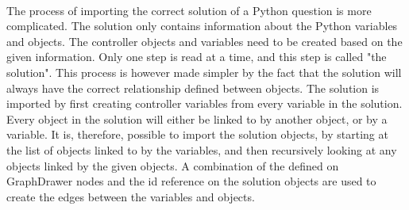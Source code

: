 \\[11pt]
The process of importing the correct solution of a Python question is more complicated. The solution only contains information about the Python variables and objects. The controller objects and variables need to be created based on the given information. Only one step is read at a time, and this step is called "the solution". This process is however made simpler by the fact that the solution will always have the correct relationship defined between objects. The solution is imported by first creating controller variables from every variable in the solution. Every object in the solution will either be linked to by another object, or by a variable. It is, therefore, possible to import the solution objects, by starting at the list of objects linked to by the variables, and then recursively looking at any objects linked by the given objects. A combination of the  defined on GraphDrawer nodes and the id reference on the solution objects are used to create the edges between the variables and objects.